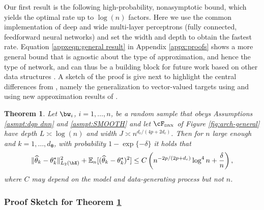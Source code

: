\documentclass[12pt]{article}
\newtheorem{theorem}{Theorem}
\numberwithin{equation}{section}
\theoremstyle{definition}
\newcommand{\E}{\mathbb{E}}
\newcommand{\btheta}{\boldsymbol{\theta}}
\newcommand{\ttrue}{\theta^\star}
\newcommand{\that}{\widehat{\theta}}
\newcommand{\dc}{d_c}  %
\newcommand{\dtheta}{d_{\btheta}}  %
\begin{document}
Our first result is the following high-probability, nonasymptotic bound, which yields the optimal rate up to $\log(n)$ factors. Here we use the common implementation of deep and wide multi-layer perceptrons (fully connected, feedforward neural networks) and set the width and depth to obtain the fastest rate. Equation \eqref{appxeqn:general result} in Appendix \ref{appx:proofs} shows a more general bound that is agnostic about the type of approximation, and hence the type of network, and can thus be a building block for future work based on other data structures \cite[\S2.3]{Farrell-Liang-Misra2021_Ecma}. A sketch of the proof is give next to highlight the central differences from \cite{Farrell-Liang-Misra2021_Ecma}, namely the generalization to vector-valued targets using \cite{Maurer2016VectorContraction} and using new approximation results of \cite{Tang2025_WP}.
\begin{theorem}
	\label{thm:dnn rates}
	Let $\bw_i$, $i=1,\ldots,n$, be a random sample that obeys Assumptions \ref{asmpt:dgp dnn} and \ref{asmpt:SMOOTH} and let $\cF_{\textsc{dnn}}$ of Figure \ref{fig:arch-general} have depth $L \asymp \log(n)$ and width $J \asymp n^{\dc / (4p + 2\dc)}$. Then for $n$ large enough and $k=1,\ldots,\dtheta$, with probability $1 - \exp\{-\delta\}$ it holds that
	\[
		\| \that_k - \ttrue_k \|^2_{L_2(\bX)}  + \E_n [ ( \that_k - \ttrue_k )^2 ]  \leq C  \left( n^{-2p/(2p+\dc)} \log^4 n + \frac{\delta}{n} \right),
	\]
	where $C$ may depend on the model and data-generating process but not $n$.
\end{theorem}





	
	


\subsubsection{Proof Sketch for Theorem \ref{thm:dnn rates}}
	\label{sec: dnn proof}
\end{document}
